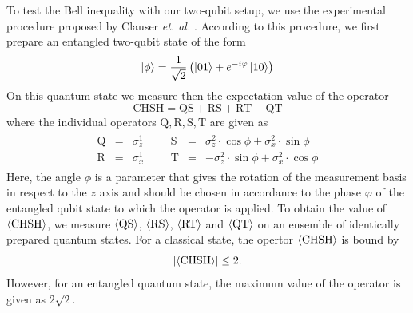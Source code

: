 To test the Bell inequality with our two-qubit setup, we use the experimental procedure proposed by Clauser {\it et. al.} \citep{clauser_proposed_1969}. According to this procedure, we first prepare an entangled two-qubit state of the form
%
\begin{equation}
\left| \phi \right> = \frac{1}{\sqrt{2}}\left(\left| 01 \right>+e^{-i\varphi}\left| 10 \right>\right) \label{eq:chsh_state}
\end{equation}
%
On this quantum state we measure then the expectation value of the operator
%
\begin{equation}
\mathrm{CHSH} = \mathrm{QS}+\mathrm{RS}+\mathrm{RT}-\mathrm{QT}
\end{equation}
%
where the individual operators $\mathrm{Q,R,S,T}$ are given as
%
\begin{eqnarray}
	\begin{array}{cccccccc}
		\mathrm{Q} & = & \sigma_z^1 &&& \mathrm{S} & = & \sigma_z^2\cdot \cos{\phi}+\sigma_x^2 \cdot \sin{\phi} \\
		\mathrm{R} & = & \sigma_x^1 &&& \mathrm{T} & = & -\sigma_z^2\cdot \sin{\phi}+\sigma_x^2 \cdot \cos{\phi}
	\end{array}
\end{eqnarray} 
%
Here, the angle $\phi$ is a parameter that gives the rotation of the measurement basis in respect to the $z$ axis and should be chosen in accordance to the phase $\varphi$ of the entangled qubit state to which the operator is applied. To obtain the value of $\left< \mathrm{CHSH} \right>$, we measure $\left< \mathrm{QS} \right>$, $\left< \mathrm{RS} \right>$, $\left< \mathrm{RT} \right>$ and $\left< \mathrm{QT} \right>$ on an ensemble of identically prepared quantum states. For a classical state, the opertor $\left< \mathrm{CHSH} \right>$ is bound by
%
\begin{equation}
\left|\left< \mathrm{CHSH} \right>\right| \le 2. \label{eq:chsh_max}
\end{equation}
%
However, for an entangled quantum state, the maximum value of the operator is given as $2\sqrt{2}$. 

\smallskip

